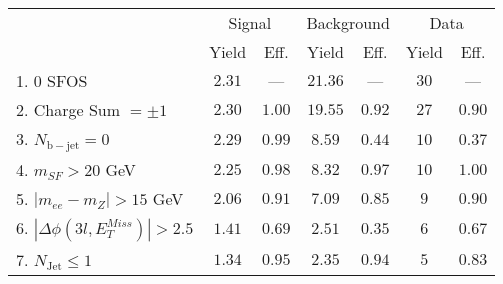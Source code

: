 \begin{tabular}{l||c|c||c|c||c|c}
\hline
 &                 \multicolumn{2}{c||}{Signal}            &  \multicolumn{2}{c||}{Background} &  \multicolumn{2}{c}{Data} \\
  & Yield & Eff. & Yield & Eff. & Yield & Eff.\\
  \hline\hline
  1. 0 SFOS &  $2.31$ &  --- &  $21.36$ &  --- & $30$ &  ---\\ 
  \hline
  2. Charge Sum $= \pm 1$ &  $2.30$ &  $1.00$ &  $19.55$ &  $0.92$ & $27$ &  $0.90$\\ 
  \hline
  3. $N_{\mathrm{b-jet}} = 0$ &  $2.29$ &  $0.99$ &  $8.59$ &  $0.44$ & $10$ &  $0.37$\\ 
  \hline
  4. $m_{SF} > 20$ GeV &  $2.25$ &  $0.98$ &  $8.32$ &  $0.97$ & $10$ &  $1.00$\\ 
  \hline
  5. $|m_{ee} - m_{Z}| > 15$ GeV &  $2.06$ &  $0.91$ &  $7.09$ &  $0.85$ & $9$ &  $0.90$\\ 
  \hline
  6. $|\Delta\phi(3l,E_{T}^{Miss})| > 2.5$ &  $1.41$ &  $0.69$ &  $2.51$ &  $0.35$ & $6$ &  $0.67$\\ 
  \hline
  7. $N_{\mathrm{Jet}} \leq 1$ &  $1.34$ &  $0.95$ &  $2.35$ &  $0.94$ & $5$ &  $0.83$\\ 
  \hline
  \end{tabular}

